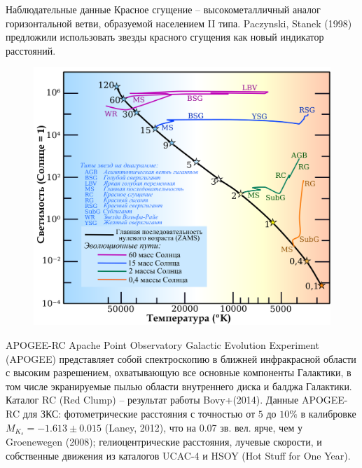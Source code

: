 \documentclass[compress]{beamer}
\begin{document}
\begin{frame}{Наблюдательные данные}
        Красное сгущение -- высокометалличный аналог горизонтальной ветви, образуемой населением II типа. Paczynski, Stanek (1998) предложили использовать звезды красного сгущения как новый индикатор расстояний.
	\begin{center}
	\begin{figure}[h]
\begin{minipage}[h]{0.65\linewidth}
\includegraphics[width=1\linewidth]{../imgs/Stellar_evolutionary_tracks-rus.png}
\end{minipage}
\end{figure}
	\end{center}
\end{frame}


\begin{frame}{APOGEE-RC}
        Apache Point Observatory Galactic Evolution Experiment (APOGEE) представляет собой спектроскопию в ближней инфракрасной области с высоким разрешением, охватывающую все основные компоненты Галактики, в том числе экранируемые пылью области внутреннего диска и балджа Галактики. Каталог RC (Red Clump)  -- результат работы Bovy+(2014). Данные APOGEE-RC для ЗКС: фотометрические расстояния с точностью от $5$ до $10\%$ в калибровке $M_{K_s} = -1.613 \pm 0.015 $ (Laney, 2012), что на 0.07 зв. вел. ярче, чем у Groenewegen (2008); гелиоцентрические расстояния, лучевые скорости, и собственные движения из каталогов UCAC-4 и HSOY (Hot Stuff for One Year). 
\end{frame}
\end{document}
